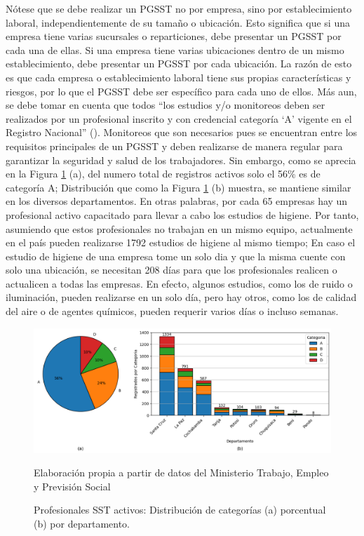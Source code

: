 Nótese que se debe realizar un PGSST no por empresa, sino por establecimiento laboral, independientemente de su tamaño o ubicación. Esto significa que si una empresa tiene varias sucursales o reparticiones, debe presentar un PGSST por cada una de ellas. Si una empresa tiene varias ubicaciones dentro de un mismo establecimiento, debe presentar un PGSST por cada ubicación. La razón de esto es que cada empresa o establecimiento laboral tiene sus propias características y riesgos, por lo que el PGSST debe ser específico para cada uno de ellos. 
Más aun, se debe tomar en cuenta que todos ``los estudios y/o monitoreos deben ser realizados por un profesional inscrito y con credencial categoría `A' vigente en el Registro Nacional'' (\cite{NTS-009/23}). Monitoreos que son necesarios pues se encuentran entre los requisitos principales de un PGSST y deben realizarse de manera regular para garantizar la seguridad y salud de los trabajadores. Sin embargo, como se aprecia en la Figura \ref{figs:profesionales_syso_por_categoria} (a), del numero total de registros activos solo el 56\% es de categoría A; Distribución que como la Figura \ref{figs:profesionales_syso_por_categoria} (b) muestra, se mantiene similar en los diversos departamentos. En otras palabras, por cada 65 empresas hay un profesional activo capacitado para llevar a cabo los estudios de higiene. Por tanto, asumiendo que estos profesionales no trabajan en un mismo equipo, actualmente en el país pueden realizarse 1792 estudios de higiene al mismo tiempo; En caso el estudio de higiene de una empresa tome un solo dia y que la misma cuente con solo una ubicación, se necesitan 208 días para que los profesionales realicen o actualicen a todas las empresas. En efecto, algunos estudios, como los de ruido o iluminación, pueden realizarse en un solo día, pero hay otros, como los de calidad del aire o de agentes químicos, pueden requerir varios días o incluso semanas.  

\begin{figure}[htb]
	\centering
	\includegraphics[width=\textwidth]{images/marcoref/profesionales_syso_por_categoria.png}
	\caption{Profesionales SST activos: Distribución de categorías (a) porcentual (b) por departamento.} \vspace{-0.2cm}
	\footnotesize{Elaboración propia a partir de datos del Ministerio Trabajo, Empleo y Previsión Social}
	\label{figs:profesionales_syso_por_categoria} 
\end{figure}

